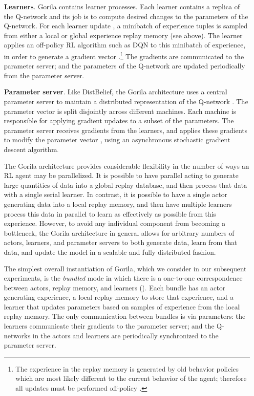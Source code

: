 \documentclass{article}
\begin{document}
{\bf Learners}. Gorila contains  learner processes. Each learner contains a replica of the Q-network and its job is to compute desired changes to the parameters of the Q-network. For each learner update , a minibatch of experience tuples  is sampled from either a local or global experience replay memory  (see above). The learner applies an off-policy RL algorithm such as DQN \cite{mnih2013atari} to this minibatch of experience, in order to generate a gradient vector .\footnote{The experience in the replay memory is generated by old behavior policies which are most likely different to the current behavior of the agent; therefore all updates must be performed off-policy \cite{sutton:book}.} The gradients  are communicated to the parameter server; and the parameters of the Q-network are updated periodically from the parameter server. 

{\bf Parameter server}. Like DistBelief, the Gorila architecture uses a central parameter server to maintain a distributed representation of the Q-network . The parameter vector  is split disjointly across  different machines. Each machine is responsible for applying gradient updates to a subset of the parameters. The parameter server receives gradients from the learners, and applies these gradients to modify the parameter vector , using an asynchronous stochastic gradient descent algorithm. 

The Gorila architecture provides considerable flexibility in the number of ways an RL agent may be parallelized. It is possible to have parallel acting to generate large quantities of data into a global replay database, and then process that data with a single serial learner. In contrast, it is possible to have a single actor generating data into a local replay memory, and then have multiple learners process this data in parallel to learn as effectively as possible from this experience. However, to avoid any individual component from becoming a bottleneck, the Gorila architecture in general allows for arbitrary numbers of actors, learners, and parameter servers to both generate data, learn from that data, and update the model in a scalable and fully distributed fashion.

The simplest overall instantiation of Gorila, which we consider in our subsequent experiments, is the \emph{bundled} mode in which there is a one-to-one correspondence between actors, replay memory, and learners (). Each bundle has an actor generating experience, a local replay memory to store that experience, and a learner that updates parameters based on samples of experience from the local replay memory. The only communication between bundles is via parameters: the learners communicate their gradients to the parameter server; and the Q-networks in the actors and learners are periodically synchronized to the parameter server.
\end{document}
